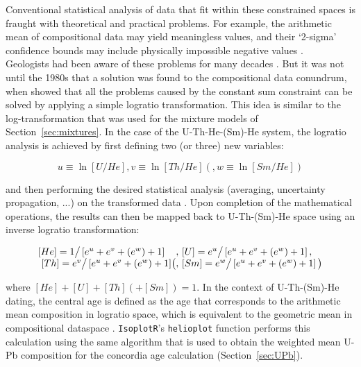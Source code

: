 \documentclass{article}
\begin{document}
Conventional statistical analysis of data that fit within these
constrained spaces is fraught with theoretical and practical
problems. For example, the arithmetic mean of compositional data may
yield meaningless values, and their `2-sigma' confidence bounds may
include physically impossible negative values \citep[Figures~3 and 5
  of][]{vermeesch2006b}.\\

Geologists had been aware of these problems for many decades
\citep[e.g.,][]{chayes1956}.  But it was not until the 1980s that a
solution was found to the compositional data conundrum, when
\citet{aitchison1982,aitchison1986} showed that all the problems
caused by the constant sum constraint can be solved by applying a
simple logratio transformation.  This idea is similar to the
log-transformation that was used for the mixture models of
Section~\ref{sec:mixtures}. In the case of the U-Th-He-(Sm)-He system,
the logratio analysis is achieved by first defining two (or three) new
variables:

\begin{equation*}
  u \equiv \ln\left[U\big/He\right],
  v \equiv \ln\left[Th\big/He\right]
  \left(, w \equiv \ln\left[Sm\big/He\right] \right)
\end{equation*}

\noindent and then performing the desired statistical analysis
(averaging, uncertainty propagation, ...) on the transformed data
\citep{vermeesch2008a,vermeesch2010a,vermeesch2015b}. Upon completion
of the mathematical operations, the results can then be mapped back to
U-Th-(Sm)-He space using an inverse logratio transformation:

\begin{equation*}
  \begin{array}{l@{}r@{}l}
    [He] = 1\big/\left[e^{u}+e^{v}+(e^{w})+1\right]
    &,~&
    [U] = e^{u}\big/\left[e^{u}+e^{v}+(e^{w})+1\right], \\~
    [Th] = e^{v}\big/\left[e^{u}+e^{v}+(e^{w})+1\right]
    &\big(,~&
    [Sm] = e^{w}\big/\left[e^{u}+e^{v}+(e^{w})+1\right] \big)
  \end{array}
\end{equation*}

\noindent where $[He] + [U] + [Th] (+ [Sm]) = 1$. In the context of
U-Th-(Sm)-He dating, the central age is defined as the age that
corresponds to the arithmetic mean composition in logratio space,
which is equivalent to the geometric mean in compositional dataspace
\citep{vermeesch2008a}. \texttt{IsoplotR}'s \texttt{helioplot}
function performs this calculation using the same algorithm that is
used to obtain the weighted mean U-Pb composition for the concordia
age calculation (Section~\ref{sec:UPb}).\\
\end{document}
